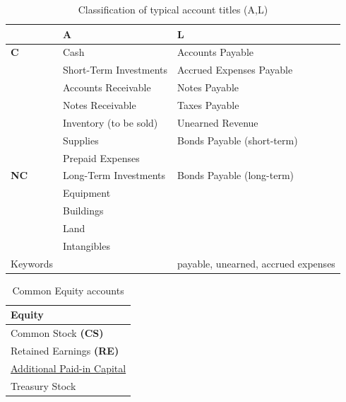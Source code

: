 \begin{table}[H]
    \centering
    \begin{tabular}{|p{}|p{}|p{}|}
        \hline
                    & \textbf{A}             & \textbf{L}                          \\
        \hline
        \textbf{C}  & Cash                   & Accounts Payable                    \\
                    & Short-Term Investments & Accrued Expenses Payable            \\
                    & Accounts Receivable    & Notes Payable                       \\
                    & Notes Receivable       & Taxes Payable                       \\
                    & Inventory (to be sold) & Unearned Revenue                    \\
                    & Supplies               & Bonds Payable (short-term)          \\
                    & Prepaid Expenses       &                                     \\
        \hline
        \textbf{NC} & Long-Term Investments  & Bonds Payable (long-term)           \\
                    & Equipment              &                                     \\
                    & Buildings              &                                     \\
                    & Land                   &                                     \\
                    & Intangibles            &                                     \\
        \hline
        Keywords    &                        & payable, unearned, accrued expenses \\
        \hline
    \end{tabular}
    \caption{Classification of typical account titles (A,L)}
\end{table}

\begin{table}[H]
    \centering
    \begin{tabular}{|p{}|}
        \hline
        \textbf{Equity}                                 \\
        \hline
        Common Stock \textbf{(CS)}                      \\
        Retained Earnings \textbf{(RE)}                 \\
        \hyperref[def:apic]{Additional Paid-in Capital} \\
        Treasury Stock                                  \\
        \hline
    \end{tabular}
    \caption{Common Equity accounts}
\end{table}

